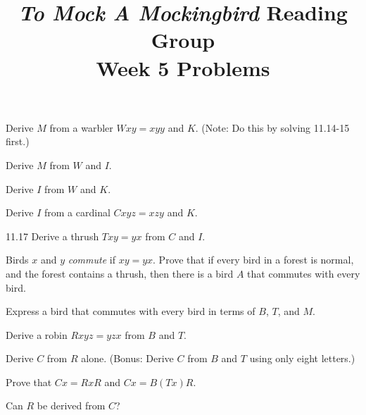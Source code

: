 \documentclass[12pt, letterpaper]{article}
\title{\emph{To Mock A Mockingbird} Reading Group\\Week 5 Problems}
\begin{document}
\maketitle

\disclaimer

\begin{prob}{11.13 }
Derive $M$ from a warbler $Wxy = xyy$ and $K$. (Note: Do this by solving 11.14-15 first.)
\end{prob}

\begin{prob}{11.14}
Derive $M$ from $W$ and $I$.
\end{prob}

\begin{prob}{11.15}
Derive $I$ from $W$ and $K$.
\end{prob}

\begin{prob}{11.16}
Derive $I$ from a cardinal $Cxyz = xzy$ and $K$.
\end{prob}

\begin{prob} 11.17  
Derive a thrush $Txy = yx$ from $C$ and $I$.
\end{prob}

\begin{prob}{11.18}
Birds $x$ and $y$ \emph{commute} if $xy = yx$. Prove that if every bird in a forest is normal, and the forest contains a thrush, then there is a bird $A$ that commutes with every bird.
\end{prob}

\begin{prob}{11.19}
Express a bird that commutes with every bird in terms of $B$, $T$, and $M$.
\end{prob}

\begin{prob}{11.20}
Derive a robin $Rxyz = yzx$ from $B$ and $T$.
\end{prob}

\begin{prob}{11.21}
Derive $C$ from $R$ alone. (Bonus: Derive $C$ from $B$ and $T$ using only eight letters.)
\end{prob}

\begin{prob}{11.22}
Prove that $Cx = RxR$ and $Cx = B(Tx)R$.
\end{prob}

\begin{prob}{11.23}
Can $R$ be derived from $C$?
\end{prob}
\end{document}
